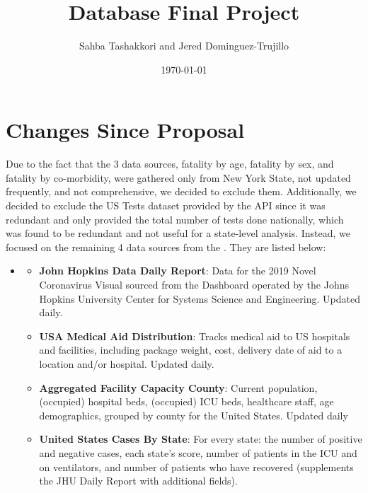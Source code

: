 \documentclass[11pt]{article}
\newcommand{\MYhref}[3][blue]{\href{#2}{\color{#1}{#3}}}%
\begin{document}
\title{Database Final Project}
\date{\today}
\author{Sahba Tashakkori and Jered Dominguez-Trujillo}

\maketitle
{}
\begin{center}
\end{center}
\newpage
\tableofcontents
{}

\pagebreak

\section{Changes Since Proposal}
\noindent
Due to the fact that the 3 data sources, fatality by age, fatality by sex, and fatality by co-morbidity, were gathered only from New York State, not updated frequently, and not comprehensive, we decided to exclude them. Additionally, we decided to exclude the US Tests dataset provided by the API since it was redundant and only provided the total number of tests done nationally, which was found to be redundant and not useful for a state-level analysis. Instead, we focused on the remaining 4 data sources from the  \MYhref{https://www.npmjs.com/package/covid19-api}{Covid-19 API}. They are listed below:

\begin{itemize}
    \item \MYhref{https://www.npmjs.com/package/covid19-api}{Covid-19 API}
        \begin{itemize}
        \item \textbf{John Hopkins Data Daily Report}: Data for the 2019 Novel Coronavirus Visual sourced from the Dashboard operated by the Johns Hopkins University Center for Systems Science and Engineering. Updated daily.
        \item \textbf{USA Medical Aid Distribution}: Tracks medical aid to US hospitals and facilities, including package weight, cost, delivery date of aid to a location and/or hospital. Updated daily.
        \item \textbf{Aggregated Facility Capacity County}: Current population, (occupied) hospital beds, (occupied) ICU beds, healthcare staff, age demographics, grouped by county for the United States. Updated daily 
        \item \textbf{United States Cases By State}: For every state: the number of positive and negative cases, each state's score, number of patients in the ICU and on ventilators, and number of patients who have recovered (supplements the JHU Daily Report with additional fields).
    \end{itemize} 
\end{itemize}
\end{document}

